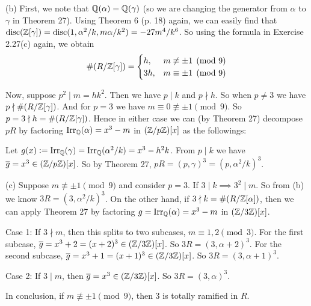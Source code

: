 \documentclass[../Marcus.tex]{subfiles}
\begin{document}
(b) First, we note that $\mathbb{Q}(\alpha) = \mathbb{Q}(\gamma)$ (so we are changing the generator from $\alpha$ to $\gamma$ in Theorem 27). Using Theorem 6 (p. 18) again, we can easily find that $\operatorname{disc}(\mathbb{Z}[\gamma])=\operatorname{disc}(1,\alpha^2/k,m\alpha/k^2)=-27m^4/k^6$. So using the formula in Exercise 2.27(c) again, we obtain 
$$
\#(R/\mathbb{Z}[\gamma]) =
\begin{cases}
h, & m\not\equiv \pm1 \pmod{9} \\
3h, & m\equiv \pm1 \pmod{9}
\end{cases}
$$

Now, suppose $p^2\mid m=hk^2$. Then we have $p\mid k$ and $p\nmid h$. So when $p\neq 3$ we have $p\nmid \#(R/\mathbb{Z}[\gamma])$. And for $p=3$ we have $m\equiv 0\not\equiv \pm 1\pmod{9}$. So $p=3\nmid h = \#(R/\mathbb{Z}[\gamma])$. Hence in either case we can (by Theorem 27) decompose $pR$ by factoring $\operatorname{Irr}_{\mathbb{Q}}(\alpha)=x^3-m$ in $(\mathbb{Z}/p\mathbb{Z})[x]$ as the followings:

Let $g(x):=\operatorname{Irr}_{\mathbb{Q}}(\gamma)=\operatorname{Irr}_{\mathbb{Q}}(\alpha^2/k)=x^3-h^2k$. From $p\mid k$ we have $\overline{g}=x^3\in(\mathbb{Z}/p\mathbb{Z})[x]$. So by Theorem 27, $pR=(p,\gamma)^3=(p,\alpha^2/k)^3$.

(c) Suppose $m\not\equiv \pm1\pmod{9}$ and consider $p=3$. If $3 \mid k \implies 3^2 \mid m$. So from (b) we know $3R=(3,\alpha^2/k)^3$. On the other hand, if $3\nmid k = \#(R/\mathbb{Z}[\alpha])$, then we can apply Theorem 27 by factoring $g=\operatorname{Irr}_{\mathbb{Q}}(\alpha)=x^3-m$ in $(\mathbb{Z}/3\mathbb{Z})[x]$.

Case 1: If $3\nmid m$, then this splits to two subcases, $m\equiv 1,2\pmod{3}$. For the first subcase, $\overline{g}=x^3+2=(x+2)^3\in(\mathbb{Z}/3\mathbb{Z})[x]$. So $3R=(3,\alpha+2)^3$. For the second subcase, $\overline{g}=x^3+1=(x+1)^3\in(\mathbb{Z}/3\mathbb{Z})[x]$. So $3R=(3,\alpha+1)^3$.

Case 2: If $3\mid m$, then $\overline{g}=x^3\in(\mathbb{Z}/3\mathbb{Z})[x]$. So $3R=(3,\alpha)^3$.

In conclusion, if $m\not\equiv \pm1\pmod{9}$, then $3$ is totally ramified in $R$.
\end{document}
